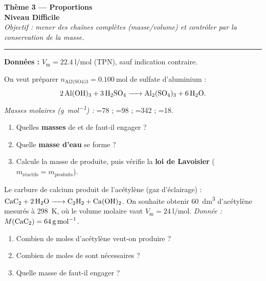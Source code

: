 \documentclass[11pt,a4paper]{article}
\newcommand{\nq}[1]{n_{\text{#1}}}
\newcommand{\Vm}{V_{\mathrm m}}
\begin{document}
\begin{center}
{\LARGE\bfseries\color{primarydark}Thème 3 — Proportions}\\[1pt]
{\large\color{difcol}\textbf{Niveau Difficile}}\\[2pt]
{\itshape Objectif : mener des chaînes complètes (masse/volume) et contrôler par la conservation de la masse.}\\
{\color{primary}\rule{0.62\linewidth}{1pt}}
\end{center}

\textbf{Données :} $\Vm=\SI{22,4}{\litre\per\mole}$ (TPN), sauf indication contraire.

\begin{exo}
On veut préparer $\nq{Al2(SO4)3}=\SI{0,100}{\mole}$ de sulfate d'aluminium :
\[ \ce{2 Al(OH)3 + 3 H2SO4 -> Al2(SO4)3 + 6 H2O}. \]
\emph{Masses molaires (\si{\gram\per\mole}) :} =78 ; =98 ;
=342 ; =18.
\begin{enumerate}[label=\textbf{\alph*)},leftmargin=2em,topsep=1pt,itemsep=1.5pt]
  \item Quelles \textbf{masses} de  et de  faut-il engager ?
  \item Quelle \textbf{masse d'eau} se forme ?
  \item Calcule la masse de  produite, puis vérifie la \textbf{loi de Lavoisier}
        ($m_{\text{réactifs}}=m_{\text{produits}}$).
\end{enumerate}
\end{exo}

\begin{exo}
Le carbure de calcium produit de l'acétylène (gaz d'éclairage) :
$\ce{CaC2 + 2 H2O -> C2H2 + Ca(OH)2}$. On souhaite obtenir \SI{60}{\deci\meter\cubed} d'acétylène
 mesurés à \SI{298}{\kelvin}, où le volume molaire vaut $\Vm=\SI{24}{\litre\per\mole}$.
\emph{Donnée :} $M(\ce{CaC2})=\SI{64}{\gram\per\mole}$.
\begin{enumerate}[label=\textbf{\alph*)},leftmargin=2em,topsep=1pt,itemsep=1.5pt]
  \item Combien de moles d'acétylène veut-on produire ?
  \item Combien de moles de  sont nécessaires ?
  \item Quelle masse de  faut-il engager ?
\end{enumerate}
\end{exo}
\end{document}
